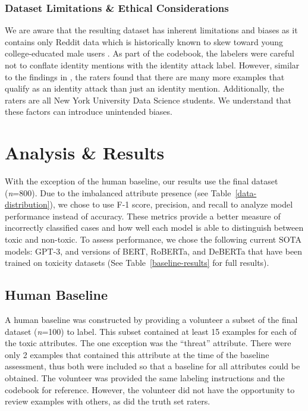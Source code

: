 \documentclass[11pt]{article}
\begin{document}
\subsubsection{Dataset Limitations \& Ethical Considerations}

We are aware that the resulting dataset has inherent limitations and biases as it contains only Reddit data which is historically known to skew toward young college-educated male users \citep{auxier2021}. As part of the codebook, the labelers were careful not to conflate identity mentions with the identity attack label. However, similar to the findings in \citet{jigsaw2018}, the raters found that there are many more examples that qualify as an identity attack than just an identity mention.  Additionally, the raters are all New York University Data Science students. We understand that these factors can introduce unintended biases.


\section{Analysis \& Results}

With the exception of the human baseline, our results use the final dataset (\emph{n}=800). Due to the imbalanced attribute presence (see Table~\ref{data-distribution}), we chose to use F-1 score, precision, and recall to analyze model performance instead of accuracy. These metrics provide a better measure of incorrectly classified cases and how well each model is able to distinguish between toxic and non-toxic. To assess performance, we chose the following current SOTA models: GPT-3, and versions of BERT, RoBERTa, and DeBERTa that have been trained on toxicity datasets (See Table~\ref{baseline-results} for full results).
\subsection{Human Baseline}
A human baseline was constructed by providing a volunteer a subset of the final dataset (\emph{n}=100) to label. This subset contained at least 15 examples for each of the toxic attributes. The one exception was the ``threat'' attribute. There were only 2 examples that contained this attribute at the time of the baseline assessment, thus both were included so that a baseline for all attributes could be obtained.  The volunteer was provided the same labeling instructions and the codebook for reference. However, the volunteer did not have the opportunity to review examples with others, as did the truth set raters.
\end{document}
